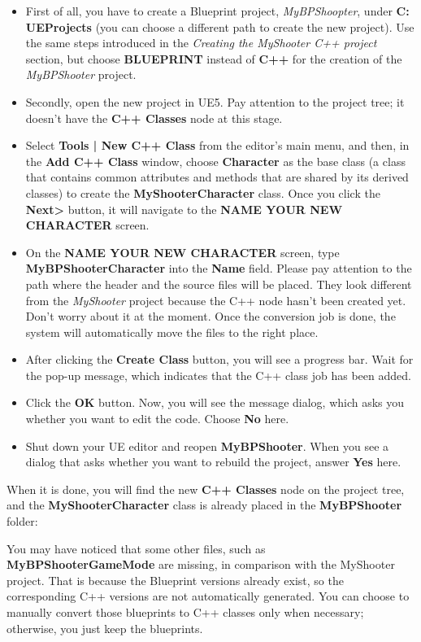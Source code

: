 \documentclass[11pt]{article} %
\begin{document}
\begin{itemize}
\item First of all, you have to create a Blueprint project, \textit{MyBPShoopter}, under \textbf{C:\\UEProjects} (you can choose a different path to create the new project). Use the same steps introduced in the \textit{Creating the MyShooter C++ project} section, but choose \textbf{BLUEPRINT} instead of \textbf{C++} for the creation of the \textit{MyBPShooter} project.
\item Secondly, open the new project in UE5. Pay attention to the project tree; it doesn’t have the \textbf{C++ Classes} node at this stage.
\item Select \textbf{Tools | New C++ Class} from the editor’s main menu, and then, in the \textbf{Add C++ Class} window, choose \textbf{Character} as the base class (a class that contains common attributes and methods that are shared by its derived classes) to create the \textbf{MyShooterCharacter} class. Once you click the \textbf{Next>} button, it will navigate to the \textbf{NAME YOUR NEW CHARACTER} screen.
\item On the \textbf{NAME YOUR NEW CHARACTER} screen, type \textbf{MyBPShooterCharacter} into the \textbf{Name} field.
Please pay attention to the path where the header and the source files will be placed. They look different from the \textit{MyShooter} project because the C++ node hasn’t been created yet. Don’t worry about it at the moment. Once the conversion job is done, the system will automatically move the files to the right place.
\item After clicking the \textbf{Create Class} button, you will see a progress bar. Wait for the pop-up message, which indicates that the C++ class job has been added.
\item Click the \textbf{OK} button. Now, you will see the message dialog, which asks you whether you want to edit the code. Choose \textbf{No} here.
\item Shut down your UE editor and reopen \textbf{MyBPShooter}. When you see a dialog that asks whether you want to rebuild the project, answer \textbf{Yes} here.
\end{itemize}

When it is done, you will find the new \textbf{C++ Classes} node on the project tree, and the \textbf{MyShooterCharacter} class is already placed in the \textbf{MyBPShooter} folder:

You may have noticed that some other files, such as \textbf{MyBPShooterGameMode} are missing, in comparison with the MyShooter project. That is because the Blueprint versions already exist, so the corresponding C++ versions are not automatically generated. You can choose to manually convert those blueprints to C++ classes only when necessary; otherwise, you just keep the blueprints.
\end{document}
